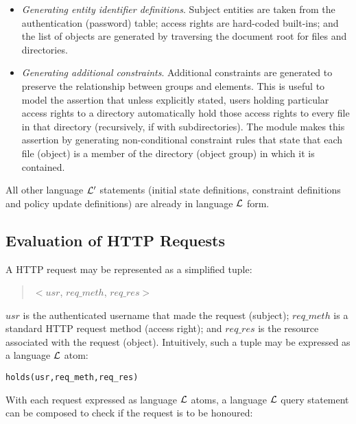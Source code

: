 \documentclass[global,twocolumn,draft]{svjour}
\newenvironment{vverbatim}
  {\begin{alltt}}
  {\vspace{-\baselineskip}\end{alltt}}
\begin{document}
      \begin{itemize}
        \item
          {\em Generating entity identifier definitions}. Subject entities are
          taken from the authentication (password) table; access rights are
          hard-coded built-ins; and the list of objects are generated by
          traversing the document root for files and directories.
        \item
          {\em Generating additional constraints}. Additional constraints are
          generated to preserve the relationship between groups and elements.
          This is useful to model the assertion that unless explicitly stated,
          users holding particular access rights to a directory automatically
          hold those access rights to every file in that directory
          (recursively, if with subdirectories). The module makes this
          assertion by generating non-conditional constraint rules that state
          that each file (object) is a member of the directory (object group)
          in which it is contained.
      \end{itemize}

      All other language ${\cal L'}$ statements (initial state definitions,
      constraint definitions and policy update definitions) are already in
      language ${\cal L}$ form.

    \subsection{Evaluation of HTTP Requests}

      A HTTP request may be represented as a simplified tuple:

      \begin{quote}
        $<$$usr$, $req\_meth$, $req\_res$$>$
      \end{quote}

      $usr$ is the authenticated username that made the request (subject);
      $req\_meth$ is a standard HTTP request method (access right); and
      $req\_res$ is the resource associated with the request (object).
      Intuitively, such a tuple may be expressed as a language ${\cal L}$ atom:

      \begin{vverbatim}
  holds(usr, req\_meth, req\_res)
      \end{vverbatim}

      With each request expressed as language ${\cal L}$ atoms, a language
      ${\cal L}$ query statement can be composed to check if the request is
      to be honoured:
\end{document}

